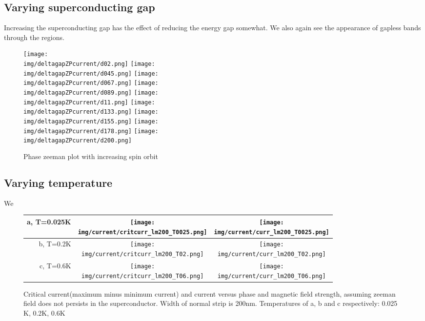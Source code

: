 \documentclass[10pt,a4paper]{article}
\newcommand{\img}{./images}
\begin{document}
	\subsection{Varying superconducting gap}
	Increasing the superconducting gap has the effect of reducing the energy gap somewhat. We also again see the appearance of gapless bands through the regions.
		\begin{figure}[H]
			\texttt{[image: \\img/deltagapZPcurrent/d02.png]}
			\texttt{[image: \\img/deltagapZPcurrent/d045.png]}
			\texttt{[image: \\img/deltagapZPcurrent/d067.png]}
			\texttt{[image: \\img/deltagapZPcurrent/d089.png]}
			\texttt{[image: \\img/deltagapZPcurrent/d11.png]}
			\texttt{[image: \\img/deltagapZPcurrent/d133.png]}
			\texttt{[image: \\img/deltagapZPcurrent/d155.png]}
			\texttt{[image: \\img/deltagapZPcurrent/d178.png]}
			\texttt{[image: \\img/deltagapZPcurrent/d200.png]}
			\caption{Phase zeeman plot with increasing spin orbit}
		\end{figure}
\newpage
	\subsection{Varying temperature}
	We 
		\begin{figure}[H]
			\begin{tabular}{rcc}
				a, T=0.025K&\texttt{[image: \\img/current/critcurr\_lm200\_T0025.png]}&
				\texttt{[image: \\img/current/curr\_lm200\_T0025.png]}\\
				\hline
				b, T=0.2K&\texttt{[image: \\img/current/critcurr\_lm200\_T02.png]}&
				\texttt{[image: \\img/current/curr\_lm200\_T02.png]}\\
				\hline
				c, T=0.6K&\texttt{[image: \\img/current/critcurr\_lm200\_T06.png]}&
				\texttt{[image: \\img/current/curr\_lm200\_T06.png]}\\
				\hline
			\end{tabular}
			\caption{Critical current(maximum minus minimum current) and current versus phase and magnetic field strength, assuming zeeman field does not persists in the superconductor. Width of normal strip is 200nm. Temperatures of a, b and c respectively: 0.025 K, 0.2K, 0.6K}
		\end{figure}
	
\end{document}
